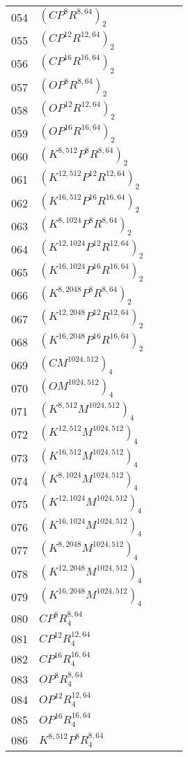 \begin{appendices}
\begin{table*}
\begin{tabular}{|l | l | l | l }
		054&$(CP^8R^{8,64})_2$ &~&~\\
		055&$(CP^{12}R^{12,64})_2$ &~&~\\
		056&$(CP^{16}R^{16,64})_2$ &~&~\\
		057&$(OP^8R^{8,64})_2$ &~&~\\
		058&$(OP^{12}R^{12,64})_2$ &~&~\\
		059&$(OP^{16}R^{16,64})_2$ &~&~\\
		060&$(K^{8,512}P^{8}R^{8,64})_2$ &~&~\\
		061&$(K^{12,512}P^{12}R^{12,64})_2$ &~&~\\
		062&$(K^{16,512}P^{16}R^{16,64})_2$ &~&~\\
		063&$(K^{8,1024}P^{8}R^{8,64})_2$ &~&~\\
		064&$(K^{12,1024}P^{12}R^{12,64})_2$ &~&~\\
		065&$(K^{16,1024}P^{16}R^{16,64})_2$ &~&~\\
		066&$(K^{8,2048}P^{8}R^{8,64})_2$ &~&~\\
		067&$(K^{12,2048}P^{12}R^{12,64})_2$ &~&~\\
		068&$(K^{16,2048}P^{16}R^{16,64})_2$ &~&~\\
		\hline
		069&$(CM^{1024,512})_4$ &~&~\\
		070&$(OM^{1024,512})_4$ &~&~\\
		071&$(K^{8,512}M^{1024,512})_4$ &~&~\\
		072&$(K^{12,512}M^{1024,512})_4$ &~&~\\
		073&$(K^{16,512}M^{1024,512})_4$ &~&~\\
		074&$(K^{8,1024}M^{1024,512})_4$ &~&~\\
		075&$(K^{12,1024}M^{1024,512})_4$ &~&~\\
		076&$(K^{16,1024}M^{1024,512})_4$ &~&~\\
		077&$(K^{8,2048}M^{1024,512})_4$ &~&~\\
		078&$(K^{12,2048}M^{1024,512})_4$ &~&~\\
		079&$(K^{16,2048}M^{1024,512})_4$ &~&~\\
		080&$CP^8R^{8,64}_4$ &~&~\\
		081&$CP^{12}R^{12,64}_4$ &~&~\\
		082&$CP^{16}R^{16,64}_4$ &~&~\\
		083&$OP^8R^{8,64}_4$ &~&~\\
		084&$OP^{12}R^{12,64}_4$ &~&~\\
		085&$OP^{16}R^{16,64}_4$ &~&~\\
		086&$K^{8,512}P^{8}R^{8,64}_4$ &~&~\\

\end{tabular}
\end{table*}
\end{appendices}
